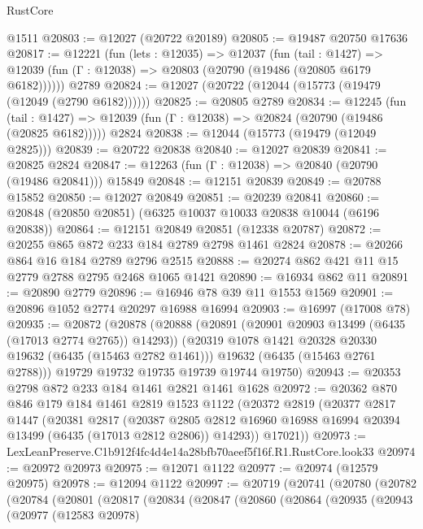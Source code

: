 \begin{lexlean}{RustCore}
\begin{coremodule}
    @1511
@20803 := @12027 (@20722 @20189)
@20805 := @19487 @20750 @17636
@20817 := @12221
    (fun (lets : @12035) =>
    @12037
      (fun (tail : @1427) =>
      @12039 (fun (Γ : @12038) => @20803 (@20790 (@19486 (@20805 @6179 @6182))))))
    @2789
@20824 := @12027 (@20722 (@12044 (@15773 (@19479 (@12049 (@2790 @6182))))))
@20825 := @20805 @2789
@20834 := @12245
    (fun (tail : @1427) => @12039 (fun (Γ : @12038) => @20824 (@20790 (@19486 (@20825 @6182)))))
    @2824
@20838 := @12044 (@15773 (@19479 (@12049 @2825)))
@20839 := @20722 @20838
@20840 := @12027 @20839
@20841 := @20825 @2824
@20847 := @12263 (fun (Γ : @12038) => @20840 (@20790 (@19486 @20841))) @15849
@20848 := @12151 @20839
@20849 := @20788 @15852
@20850 := @12027 @20849
@20851 := @20239 @20841
@20860 := @20848 (@20850 @20851) (@6325 @10037 @10033 @20838 @10044 (@6196 @20838))
@20864 := @12151 @20849 @20851 (@12338 @20787)
@20872 := @20255 @865 @872 @233 @184 @2789 @2798 @1461 @2824
@20878 := @20266 @864 @16 @184 @2789 @2796 @2515
@20888 := @20274 @862 @421 @11 @15 @2779 @2788 @2795 @2468 @1065 @1421
@20890 := @16934 @862 @11
@20891 := @20890 @2779
@20896 := @16946 @78 @39 @11 @1553 @1569
@20901 := @20896 @1052 @2774 @20297 @16988 @16994
@20903 := @16997 (@17008 @78)
@20935 := @20872
    (@20878
      (@20888
        (@20891 (@20901 @20903 @13499 (@6435 (@17013 @2774 @2765)) @14293))
        (@20319 @1078 @1421 @20328 @20330 @19632 (@6435 (@15463 @2782 @1461)))
        @19632
        (@6435 (@15463 @2761 @2788)))
      @19729
      @19732
      @19735
      @19739
      @19744
      @19750)
@20943 := @20353 @2798 @872 @233 @184 @1461 @2821 @1461 @1628
@20972 := @20362
    @870
    @846
    @179
    @184
    @1461
    @2819
    @1523
    @1122
    (@20372
      @2819
      (@20377
        @2817
        @1447
        (@20381
          @2817
          (@20387
            @2805
            @2812
            @16960
            @16988
            @16994
            @20394
            @13499
            (@6435 (@17013 @2812 @2806))
            @14293))
        @17021))
@20973 := LexLeanPreserve.C1b912f4fc4d4e14a28bfb70aeef5f16f.R1.RustCore.look33
@20974 := @20972 @20973
@20975 := @12071 @1122
@20977 := @20974 (@12579 @20975)
@20978 := @12094 @1122
@20997 := @20719
    (@20741
      (@20780
        (@20782
          (@20784
            (@20801
              (@20817
                (@20834
                  (@20847
                    (@20860
                      (@20864
                        (@20935
                          (@20943
                            (@20977
                              (@12583 @20978)

\end{coremodule}
\end{lexlean}
